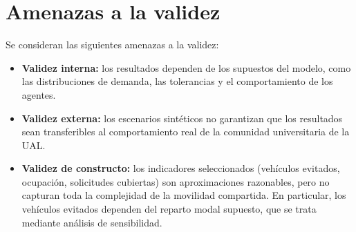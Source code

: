 \section{Amenazas a la validez}
\label{sec:amenazas-validez}

Se consideran las siguientes amenazas a la validez:
\begin{itemize}
    \item \textbf{Validez interna:} los resultados dependen de los supuestos del modelo, como las distribuciones de demanda, las tolerancias y el comportamiento de los agentes.
    \item \textbf{Validez externa:} los escenarios sintéticos no garantizan que los resultados sean transferibles al comportamiento real de la comunidad universitaria de la UAL.
    \item \textbf{Validez de constructo:} los indicadores seleccionados (vehículos evitados, ocupación, solicitudes cubiertas) son aproximaciones razonables, pero no capturan toda la complejidad de la movilidad compartida. En particular, los vehículos evitados dependen del reparto modal supuesto, que se trata mediante análisis de sensibilidad.
\end{itemize}
